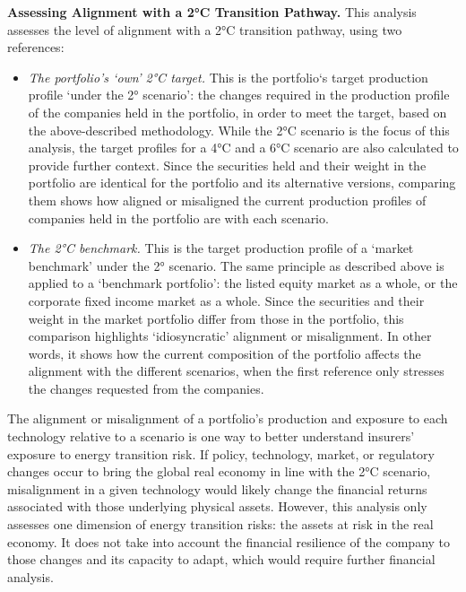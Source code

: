 \documentclass[10pt,table,a4]{article}\usepackage[]{graphicx}\usepackage[]{color}
\begin{document}
	\begin{multicols}{2}
		
		
		\textbf{Assessing Alignment with a 2°C Transition Pathway. }This analysis assesses the level of alignment with a 2°C transition 	pathway, using two references:
		
		\begin{itemize}
			\item{\textit{The portfolio's ‘own’ 2°C target.} This is the portfolio‘s target production profile ‘under the 2° scenario’: the 	changes required in the production profile of the companies held in the portfolio, in order to meet the target, based on the above-described methodology. While the 2°C scenario is the focus of this analysis, the target profiles for a 4°C and a 6°C scenario are also calculated to provide further context. Since the securities held and their weight in the portfolio are identical for the portfolio and its alternative versions, comparing them shows how aligned or misaligned the current production profiles of companies held in the portfolio are with each scenario.}
			
			\item{\textit{The 2°C benchmark. }This is the target production profile of a ‘market benchmark’ under the 2° scenario. The same 	principle as described above is applied to a ‘benchmark portfolio’: the listed equity market as a whole, or the corporate fixed income market as a whole. Since the securities and their weight in the market portfolio differ from those in the portfolio, this comparison highlights ‘idiosyncratic’ alignment or misalignment. In other words, it shows how the current composition of the portfolio affects the alignment with the different scenarios, when the first reference only stresses the changes requested from the companies.}
		\end{itemize}
		
		
		The alignment or misalignment of a portfolio’s production and exposure to each technology relative to a scenario is one way to better understand insurers’ exposure to energy transition risk. If policy, technology, market, or regulatory changes occur to bring the global real economy in line with the 2°C scenario, misalignment in a given technology would likely change the financial returns associated with those underlying physical assets. However, this analysis only assesses one dimension of energy transition risks: the assets at risk in the real economy. It does not take into account the financial resilience of the company to those changes and its capacity to adapt, which would require further financial analysis.
		

\end{multicols}
\end{document}

